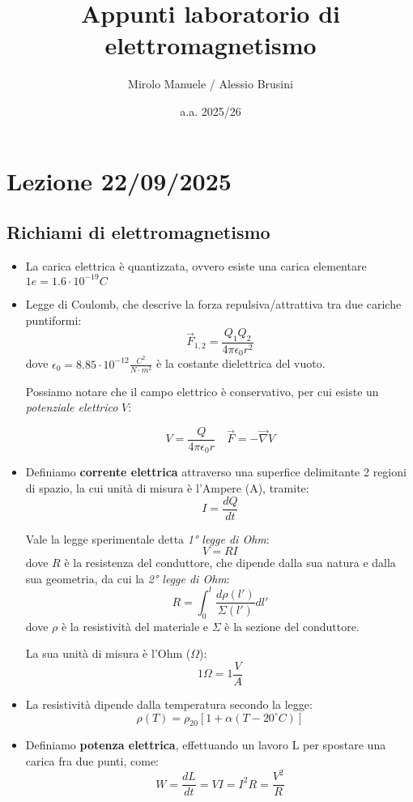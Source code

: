 \documentclass{article}
\title{Appunti laboratorio di elettromagnetismo}
\author{ Mirolo Manuele / Alessio Brusini}
\date{a.a. 2025/26}
\begin{document}
\maketitle
\justifying
\tableofcontents
\newpage
\section{Lezione 22/09/2025}
\subsection{Richiami di elettromagnetismo}
\begin{itemize}
    \item La carica elettrica è quantizzata, ovvero esiste una carica elementare $1 e = 1.6 \cdot 10^{-19} C$
    \item Legge di Coulomb, che descrive la forza repulsiva/attrattiva tra due cariche puntiformi:
    \[
    \vec{F}_{1,2} = \frac{Q_1 Q_2}{4\pi\epsilon_0 r^2}
    \]
    dove $\epsilon_0 = 8.85 \cdot 10^{-12} \frac{C^2}{N \cdot m^2}$ è la costante dielettrica del vuoto.
    
    Possiamo notare che il campo elettrico è conservativo, per cui esiste un \textit{potenziale elettrico} $V$: 

    \begin{equation*}
        V=\frac{Q}{4 \pi \epsilon_0 r} \quad \vec{F} = - \vec{\nabla} V 
    \end{equation*}

    \item Definiamo \textbf{corrente elettrica} attraverso una superfice delimitante 2 regioni di spazio, la cui unità di misura è l'Ampere (A), tramite:
    \[
    I = \frac{dQ}{dt}
    \]

    Vale la legge sperimentale detta \textit{1° legge di Ohm}:
    \[
    V = R I
    \]
    dove $R$ è la resistenza del conduttore, che dipende dalla sua natura e dalla sua geometria, da cui la \textit{2° legge di Ohm}:
    \[
    R= \int_{0}^{l} \frac{d\rho(l')}{\Sigma(l')} dl'
    \]
    dove $\rho$ è la resistività del materiale e $\Sigma$ è la sezione del conduttore.
    
    La sua unità di misura è l'Ohm ($\Omega$):
    \[
    1 \Omega = 1 \frac{V}{A}
    \]

    \item La resistività dipende dalla temperatura secondo la legge:
    \[
    \rho(T) = \rho_{20} [1 + \alpha (T - 20^\circ C)]
    \]

    \item Definiamo \textbf{potenza elettrica}, effettuando un lavoro L per spostare una carica fra due punti, come:
    \[
    W = \frac{dL}{dt} = V I = I^2 R = \frac{V^2}{R}
    \]


\end{itemize}
\end{document}
